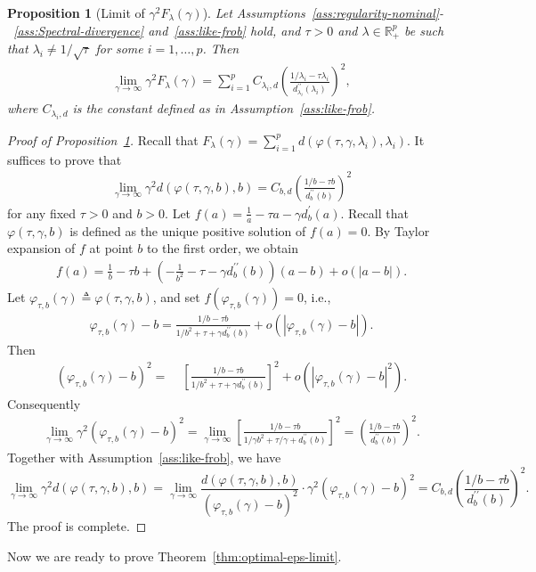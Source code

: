 \documentclass[11pt]{article}
\def\R{\mathbb{R}}
\newtheorem{proposition}{Proposition}
\newcommand{\bgeqn}{\begin{eqnarray}}
\newcommand{\edeqn}{\end{eqnarray}}
\newcommand{\Let}{\triangleq}
\def\R{\mathbb{R}}
\begin{document}
\begin{proposition}[Limit of $\gamma^2F_{\lambda}(\gamma)$]\label{prop:rate-of-d}
    Let Assumptions~\ref{ass:regularity-nominal}-~\ref{ass:Spectral-divergence} and~\ref{ass:like-frob} hold, and 
    $\tau>0$ and $\lambda\in\R^p_+$ be such that $\lambda_i\neq 1/\sqrt{\tau}$ for some $i=1,\ldots,p$.
    Then
        \bgeqn 
        \label{eq:Prop14-proof-1}
        \lim_{\gamma\to\infty} \gamma^2  F_{\lambda}(\gamma) = \sum_{i=1}^p C_{\lambda_i, d} \left(\frac{1/\lambda_i-\tau \lambda_i}{d_{\lambda_i}^{\prime\prime}(\lambda_i)} \right)^2,
    \edeqn
    where $C_{\lambda_i, d}$ is the constant defined as in Assumption~\ref{ass:like-frob}.
\end{proposition}



\begin{proof}[Proof of Proposition~\ref{prop:rate-of-d}]
    Recall that $F_{\lambda}(\gamma) = \sum_{i=1}^p d(\varphi(\tau, \gamma, \lambda_i), \lambda_i)$.
    It suffices to prove that 
    \bgeqn 
        \lim_{\gamma\to \infty} \gamma^2 d(\varphi(\tau, \gamma, b), b) = C_{b,d} \left(\frac{1/b-\tau b}{d_b^{\prime\prime}(b)} \right)^2
    \edeqn 
    for any fixed $\tau >0$ and $b>0$.
    Let 
    $
        f(a) = \frac{1}{a}-\tau a -\gamma d_b^\prime(a).
    $
    Recall that $\varphi(\tau, \gamma, b)$ is defined as the unique positive solution of $f(a)=0$.
 By Taylor expansion of $f$ at point $b$ to the first order, we obtain
    \begin{align*}
        f(a) = \frac{1}{b} - \tau b + \left(-\frac{1}{b^2}-\tau -\gamma d_b^{\prime\prime}(b)\right)(a-b) + o(|a-b|).
    \end{align*}
    Let $\varphi_{\tau,b}(\gamma) \Let \varphi(\tau, \gamma, b)$, and set $f(\varphi_{\tau,b}(\gamma))=0$, i.e., 
    \begin{align*}
        \varphi_{\tau,b}(\gamma)-b = \frac{1/b-\tau b}{1/b^2+\tau+\gamma d_b^{\prime\prime}(b)} + o(|\varphi_{\tau,b}(\gamma)-b|).
    \end{align*}
    Then 
    \begin{align*}
        (\varphi_{\tau,b}(\gamma)-b)^2 = 
         \;&\left[\frac{1/b-\tau b}{1/b^2+\tau+\gamma d_b^{\prime\prime}(b)}\right]^2 + o(|\varphi_{\tau,b}(\gamma)-b|^2).
    \end{align*}
    Consequently
    \begin{align*}
        \lim_{\gamma\to\infty} \gamma^2 (\varphi_{\tau,b}(\gamma)-b)^2 =\lim_{\gamma \to \infty}\left[\frac{1/b-\tau b}{1/\gamma b^2+\tau/\gamma+d_b^{\prime\prime}(b)}\right]^2 = \left(\frac{1/b-\tau b}{d_b^{\prime\prime}(b)}\right)^2.
    \end{align*}
    Together with Assumption~\ref{ass:like-frob}, we have 
    \[
        \lim_{\gamma \to \infty} \gamma^2 d(\varphi(\tau, \gamma, b), b) = 
        \lim_{\gamma \to \infty}  
        \frac{d(\varphi(\tau, \gamma, b), b)}{(\varphi_{\tau,b}(\gamma)-b)^2 } \cdot \gamma^2 (\varphi_{\tau,b}(\gamma)-b)^2
        =
        C_{b,d} \left(\frac{1/b-\tau b}{d_b^{\prime\prime}(b)}\right)^2.
    \]
    The proof is complete.
\end{proof}
Now we are ready to prove Theorem~\ref{thm:optimal-eps-limit}.
\end{document}
